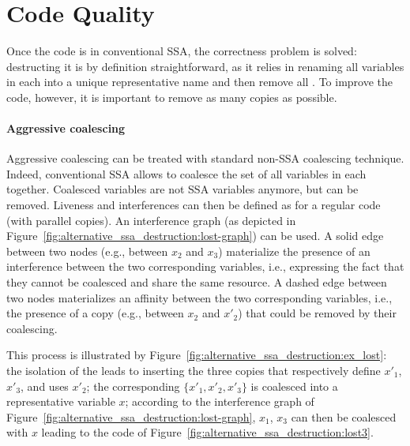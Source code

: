 \section{Code Quality}
\label{sec:destruct:quality}
Once the code is in conventional SSA, the correctness problem is solved: 
destructing it is by definition straightforward, as it relies in renaming all variables in each \phiweb into a unique representative name and then remove all \phifuns. 
To improve the code, however, it is important to remove as many copies as possible.

\paragraph{Aggressive coalescing}
Aggressive coalescing can be treated with standard non-SSA coalescing technique.
Indeed, conventional SSA allows to coalesce the set of all variables in each \phiweb together.
Coalesced variables are not SSA variables anymore, but \phifuns can be removed.
Liveness and interferences can then be defined as for a regular code (with parallel copies). 
An interference graph (as depicted in Figure~\ref{fig:alternative_ssa_destruction:lost-graph}) can be used. 
A solid edge between two nodes (e.g., between $x_2$ and $x_3$) materialize the presence of an interference between the two corresponding variables, i.e., expressing the fact that they cannot be coalesced and share the same resource. 
A dashed edge between two nodes materializes an affinity between the two corresponding variables, i.e., the presence of a copy (e.g., between $x_2$ and $x'_2$) that could be removed by their coalescing.

This process is illustrated by Figure~\ref{fig:alternative_ssa_destruction:ex_lost}: 
the isolation of the \phifun leads to inserting the three copies that respectively define $x'_1$, $x'_3$, and uses $x'_2$; 
the corresponding \phiweb $\{x'_1, x'_2, x'_3\}$ is coalesced into a representative variable $x$; 
according to the interference graph of Figure~\ref{fig:alternative_ssa_destruction:lost-graph}, $x_1$, $x_3$ can then be coalesced with $x$ leading to the code of Figure~\ref{fig:alternative_ssa_destruction:lost3}.

